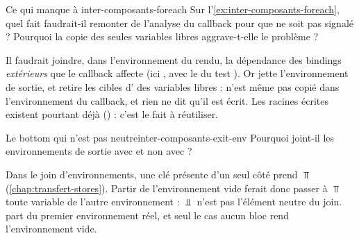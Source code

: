 \begin{exercice}{Ce qui manque à }{inter-composants-foreach}
Sur l'\cref{ex:inter-composants-foreach}, quel fait faudrait-il remonter de l'analyse du
callback pour que  ne soit pas signalé ? Pourquoi la copie des seules variables
libres aggrave-t-elle le problème ?
\end{exercice}
\begin{solution}
Il faudrait joindre, dans l'environnement du rendu, la dépendance des bindings \emph{extérieurs}
que le callback affecte (ici , avec le  du test ). Or
 jette l'environnement de sortie, et  retire les cibles
d' des variables libres :  n'est même pas copié dans l'environnement du
callback, et rien ne dit qu'il est écrit. Les racines écrites existent pourtant déjà
() : c'est le fait à réutiliser.
\end{solution}

\begin{exercice}{Le bottom qui n'est pas neutre}{inter-composants-exit-env}
Pourquoi  joint-il les environnements de sortie avec
 et non avec  ?
\end{exercice}
\begin{solution}
Dans le join d'environnements, une clé présente d'un seul côté prend $\Top$
(\cref{chap:transfert-stores}). Partir de l'environnement vide ferait donc passer à $\Top$
toute variable de l'autre environnement : $\Bot$ n'est pas l'élément neutre du join. 
part du premier environnement réel, et seul le cas \og aucun bloc \fg{} rend
l'environnement vide.
\end{solution}
